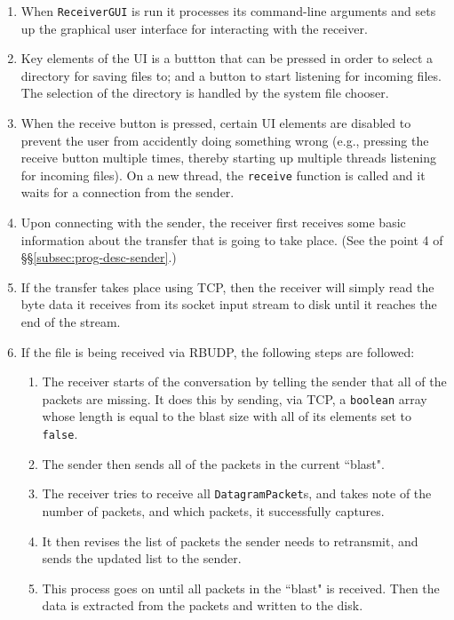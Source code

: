 \documentclass[10pt, a4paper]{article}
\begin{document}
\begin{enumerate}
  \item When \texttt{ReceiverGUI} is run it processes its command-line arguments
    and sets up the graphical user interface for interacting with the receiver.
  \item Key elements of the UI is a buttton that can be pressed in order to
    select a directory for saving files to; and a button to start listening for
    incoming files. The selection of the directory is handled by the system file
    chooser.
  \item When the receive button is pressed, certain UI elements are disabled to
    prevent the user from accidently doing something wrong (e.g., pressing the
    receive button multiple times, thereby starting up multiple threads
    listening for incoming files). On a new thread, the \texttt{receive}
    function is called and it waits for a connection from the sender.
  \item Upon connecting with the sender, the receiver first receives some basic
    information about the transfer that is going to take place. (See the point 4
    of \S\S\ref{subsec:prog-desc-sender}.)
  \item If the transfer takes place using TCP, then the receiver will simply
    read the byte data it receives from its socket input stream to disk until it
    reaches the end of the stream.
  \item If the file is being received via RBUDP, the following steps are
    followed:
    \begin{enumerate}
      \item The receiver starts of the conversation by telling the sender that
        all of the packets are missing. It does this by sending, via TCP, a
        \texttt{boolean} array whose length is equal to the blast size with
        all of its elements set to \texttt{false}.
      \item The sender then sends all of the packets in the current ``blast".
      \item The receiver tries to receive all \texttt{DatagramPacket}s, and
        takes note of the number of packets, and which packets, it successfully
        captures.
      \item It then revises the list of packets the sender needs to retransmit,
        and sends the updated list to the sender.
      \item This process goes on until all packets in the ``blast" is received.
        Then the data is extracted from the packets and written to the disk.

\end{enumerate}
\end{enumerate}
\end{document}
